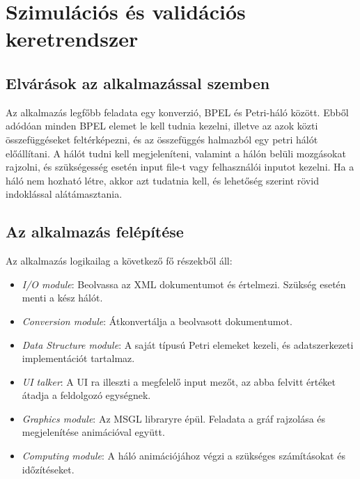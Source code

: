\chapter{Szimulációs és validációs keretrendszer}
\section{Elvárások az alkalmazással szemben}

Az alkalmazás legfőbb feladata egy konverzió, BPEL és Petri-háló között. Ebből adódóan minden BPEL elemet le kell tudnia kezelni, illetve az azok közti összefüggéseket feltérképezni, és az összefüggés halmazból egy petri hálót előállítani. A hálót tudni kell megjeleníteni, valamint a hálón belüli mozgásokat rajzolni, és szükségesség esetén input file-t vagy felhasználói inputot kezelni. Ha a háló nem hozható létre, akkor azt tudatnia kell, és lehetőség szerint rövid indoklással alátámasztania. 

\section{Az alkalmazás felépítése}

Az alkalmazás logikailag a következő fő részekből áll:
\begin{itemize}
\item \textit{I/O module}: Beolvassa az XML dokumentumot és értelmezi. Szükség esetén menti a kész hálót.
\item \textit{Conversion module}: Átkonvertálja  a beolvasott dokumentumot.
\item \textit{Data Structure module}: A saját típusú Petri elemeket kezeli, és adatszerkezeti implementációt tartalmaz. 
\item \textit{UI talker}: A UI ra illeszti a megfelelő input mezőt, az abba felvitt értéket átadja a feldolgozó egységnek.
\item \textit{Graphics module}: Az MSGL libraryre épül. Feladata a gráf rajzolása és megjelenítése animációval együtt. 
\item \textit{Computing module}: A háló animációjához végzi a szükséges számításokat és időzítéseket. 
\end{itemize}
